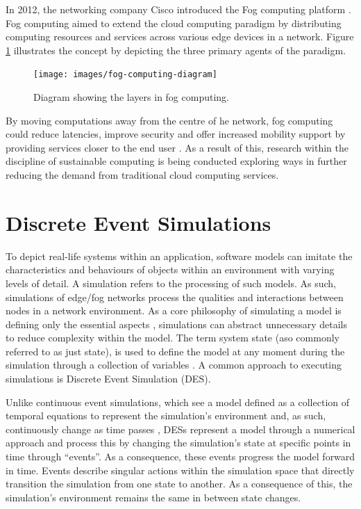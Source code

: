 \documentclass{l4proj}
\begin{document}
In 2012, the networking company Cisco introduced the Fog computing platform \citep{fog_computing}.
Fog computing aimed to extend the cloud computing paradigm by distributing computing resources and services across various edge devices in a network.
Figure \ref{fig:fog-diagram} illustrates the concept by depicting the three primary agents of the paradigm.
\begin{figure}[h]
    \centering
    \texttt{[image: images/fog-computing-diagram]}
    ~
    \caption{Diagram showing the layers in fog computing.}
    \label{fig:fog-diagram}
\end{figure}
By moving computations away from the centre of he network, fog computing could reduce latencies, improve security and offer increased mobility support by providing services closer to the end user \citep{fog_computing}.
As a result of this, research within the discipline of sustainable computing \citep{sustainableFog} is being conducted exploring ways in further reducing the demand from traditional cloud computing services.

\section{Discrete Event Simulations}

To depict real-life systems within an application, software models can imitate the characteristics and behaviours of objects within an environment with varying levels of detail.
A simulation refers to the processing of such models.
As such, simulations of edge/fog networks process the qualities and interactions between nodes in a network environment.
As a core philosophy of simulating a model is defining only the essential aspects \citep{simulations}, simulations can abstract unnecessary details to reduce complexity within the model.
The term system state (aso commonly referred to as just state), is used to define the model at any moment during the simulation through a collection of variables \citep{des-old}.
A common approach to executing simulations is Discrete Event Simulation (DES).

Unlike continuous event simulations, which see a model defined as a collection of temporal equations to represent the simulation's environment and, as such, continuously change as time passes \cite{simpy}, DESs represent a model through a numerical approach and process this by changing the simulation's state at specific points in time through ``events''.
As a consequence, these events progress the model forward in time.
Events describe singular actions within the simulation space that directly transition the simulation from one state to another.
As a consequence of this, the simulation's environment remains the same in between state changes.
\end{document}
